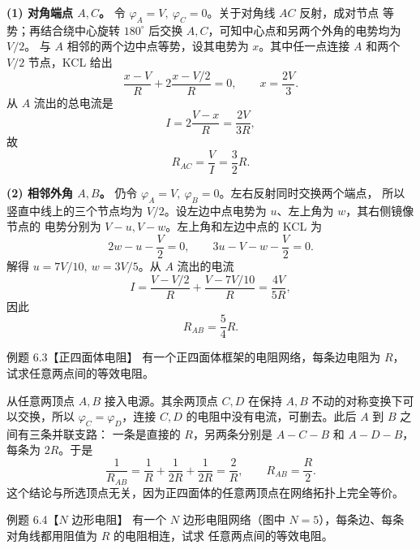\begin{xesolution}
\textbf{(1) 对角端点 $A,C$。} 令 $\varphi_A=V,\ \varphi_C=0$。关于对角线 $AC$ 反射，成对节点
等势；再结合绕中心旋转 $180^\circ$ 后交换 $A,C$，可知中心点和另两个外角的电势均为 $V/2$。
与 $A$ 相邻的两个边中点等势，设其电势为 $x$。其中任一点连接 $A$ 和两个 $V/2$ 节点，KCL 给出
\[
  \frac{x-V}{R}+2\frac{x-V/2}{R}=0,
  \qquad x=\frac{2V}{3}.
\]
从 $A$ 流出的总电流是
\[
  I=2\frac{V-x}{R}=\frac{2V}{3R},
\]
故
\[
  \boxed{R_{AC}=\frac VI=\frac32R}.
\]

\gridPotentialDiagonalFigure
{}

\textbf{(2) 相邻外角 $A,B$。} 仍令 $\varphi_A=V,\ \varphi_B=0$。左右反射同时交换两个端点，
所以竖直中线上的三个节点均为 $V/2$。设左边中点电势为 $u$、左上角为 $w$，其右侧镜像节点的
电势分别为 $V-u,V-w$。左上角和左边中点的 KCL 为
\[
  2w-u-\frac V2=0,
  \qquad
  3u-V-w-\frac V2=0.
\]
解得 $u=7V/10,\ w=3V/5$。从 $A$ 流出的电流
\[
  I=\frac{V-V/2}{R}+\frac{V-7V/10}{R}=\frac{4V}{5R},
\]
因此
\[
  \boxed{R_{AB}=\frac54R}.
\]

\gridPotentialAdjacentFigure
{}
\end{xesolution}

\begin{origexamplebox}{例题 6.3【正四面体电阻】}
有一个正四面体框架的电阻网络，每条边电阻为 $R$，试求任意两点间的等效电阻。
\tetrahedronProblemFigure
{}
\end{origexamplebox}



\begin{xesolution}
从任意两顶点 $A,B$ 接入电源。其余两顶点 $C,D$ 在保持 $A,B$ 不动的对称变换下可以交换，所以
$\varphi_C=\varphi_D$，连接 $C,D$ 的电阻中没有电流，可删去。此后 $A$ 到 $B$ 之间有三条并联支路：
一条是直接的 $R$，另两条分别是 $A-C-B$ 和 $A-D-B$，每条为 $2R$。于是
\[
  \frac1{R_{AB}}=\frac1R+\frac1{2R}+\frac1{2R}=\frac2R,
  \qquad
  \boxed{R_{AB}=\frac R2}.
\]
这个结论与所选顶点无关，因为正四面体的任意两顶点在网络拓扑上完全等价。
\end{xesolution}

\begin{origexamplebox}{例题 6.4【$N$ 边形电阻】}
有一个 $N$ 边形电阻网络（图中 $N=5$），每条边、每条对角线都用阻值为 $R$ 的电阻相连，试求
任意两点间的等效电阻。
\completeGraphProblemFigure
{}
\end{origexamplebox}



